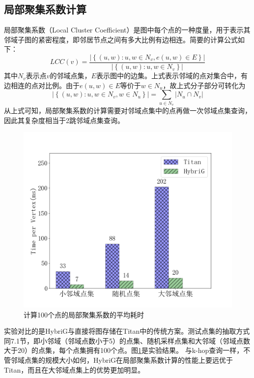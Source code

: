 \subsection{局部聚集系数计算}
局部聚集系数（Local Cluster Coefficient）是图中每个点的一种度量，用于表示其邻域子图的紧密程度，即邻居节点之间有多大比例有边相连。简要的计算公式如下：
$$LCC(v) = \frac{\left | \left \{(u,w):u,w \in{N_v}, e(u,w)\in{E} \right \} \right |}{\left | \left \{(u,w):u,w\in N_v\right \} \right |}$$
其中$N_v$表示点$v$的邻域点集，$E$表示图中的边集。上式表示邻域的点对集合中，有边相连的点对比例。由于$e(u,w)\in{E}$等价于$w\in{N_u}$，故上式分子部分可转化为
$$\left | \left \{ (u,w):u,w\in{N_v},w\in{N_u} \right \} \right | = \sum_{u\in{N_v}}{\left | N_u \cap N_v  \right |}$$
从上式可知，局部聚集系数的计算需要对邻域点集中的点再做一次邻域点集查询，因此其复杂度相当于2跳邻域点集查询。

\begin{figure}[htbp]
\centering
\includegraphics[width=120mm]{fig/local_cc.png}
\caption{计算100个点的局部聚集系数的平均耗时}
\label{fig:local_cc}
\end{figure}

实验对比的是HybriG与直接将图存储在Titan中的传统方案。测试点集的抽取方式同7.1节，即小邻域（邻域点数小于5）的点集、随机采样点集和大邻域（邻域点数大于20）的点集，每个点集拥有100个点。图\ref{fig:local_cc}是实验结果。
与k-hop查询一样，不管邻域点集的规模大小如何，HybriG在局部聚集系数计算的性能上要远优于Titan，而且在大邻域点集上的优势更加明显。

